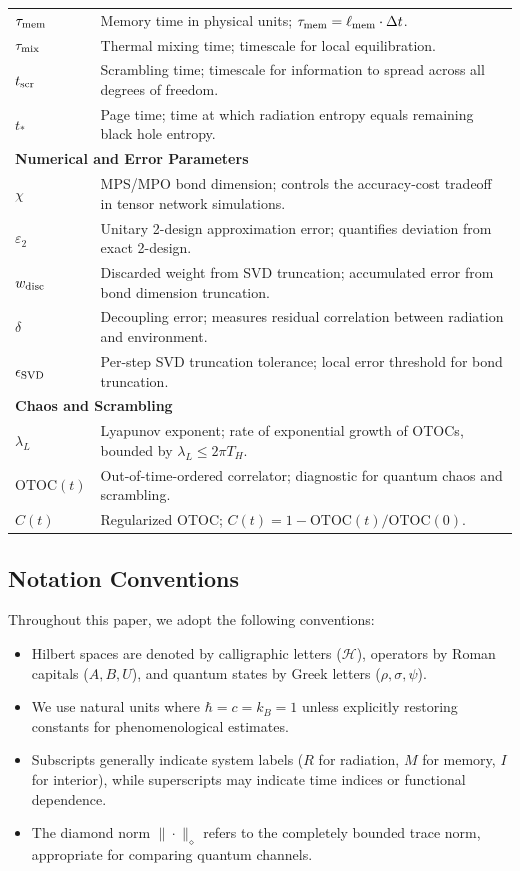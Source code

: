 \documentclass[a4paper,11pt]{article}
\theoremstyle{plain}
\theoremstyle{definition}
\theoremstyle{remark}
\begin{document}
\begin{longtable}{@{}lp{10cm}@{}}
$\tau_{\rm mem}$ & Memory time in physical units; $\tau_{\rm mem} = \ell_{\rm mem} \cdot \Delta t$. \\
$\tau_{\rm mix}$ & Thermal mixing time; timescale for local equilibration. \\
$t_{\rm scr}$ & Scrambling time; timescale for information to spread across all degrees of freedom. \\
$t_*$ & Page time; time at which radiation entropy equals remaining black hole entropy. \\
\midrule
\multicolumn{2}{l}{\textbf{Numerical and Error Parameters}} \\
\midrule
$\chi$ & MPS/MPO bond dimension; controls the accuracy-cost tradeoff in tensor network simulations. \\
$\varepsilon_2$ & Unitary 2-design approximation error; quantifies deviation from exact 2-design. \\
$w_{\rm disc}$ & Discarded weight from SVD truncation; accumulated error from bond dimension truncation. \\
$\delta$ & Decoupling error; measures residual correlation between radiation and environment. \\
$\epsilon_{\rm SVD}$ & Per-step SVD truncation tolerance; local error threshold for bond truncation. \\
\midrule
\multicolumn{2}{l}{\textbf{Chaos and Scrambling}} \\
\midrule
$\lambda_L$ & Lyapunov exponent; rate of exponential growth of OTOCs, bounded by $\lambda_L \leq 2\pi T_H$. \\
$\mathrm{OTOC}(t)$ & Out-of-time-ordered correlator; diagnostic for quantum chaos and scrambling. \\
$C(t)$ & Regularized OTOC; $C(t) = 1 - \mathrm{OTOC}(t)/\mathrm{OTOC}(0)$. \\
\bottomrule
\end{longtable}

\subsection{Notation Conventions}
Throughout this paper, we adopt the following conventions:
\begin{itemize}[leftmargin=*]
\item Hilbert spaces are denoted by calligraphic letters ($\mathcal{H}$), operators by Roman capitals ($A, B, U$), and quantum states by Greek letters ($\rho, \sigma, \psi$).
\item We use natural units where $\hbar = c = k_B = 1$ unless explicitly restoring constants for phenomenological estimates.
\item Subscripts generally indicate system labels ($R$ for radiation, $M$ for memory, $I$ for interior), while superscripts may indicate time indices or functional dependence.
\item The diamond norm $\|\cdot\|_\diamond$ refers to the completely bounded trace norm, appropriate for comparing quantum channels.
\end{itemize}
\end{document}
